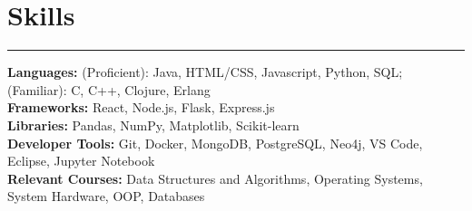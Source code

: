 \documentclass[10pt]{article}
\begin{document}
\section*{Skills}
\vspace{-2mm}
\hrule
\vspace{0mm}
\textbf{Languages:} (Proficient): Java, HTML/CSS, Javascript, Python, SQL; (Familiar): C, C++, Clojure, Erlang \\
\textbf{Frameworks:} React, Node.js, Flask, Express.js  \\
\textbf{Libraries:} Pandas, NumPy, Matplotlib, Scikit-learn \\
\textbf{Developer Tools:} Git, Docker, MongoDB, PostgreSQL, Neo4j, VS Code, Eclipse, Jupyter Notebook \\
\textbf{Relevant Courses:} Data Structures and Algorithms, Operating Systems, System Hardware, OOP, Databases
\end{document}
